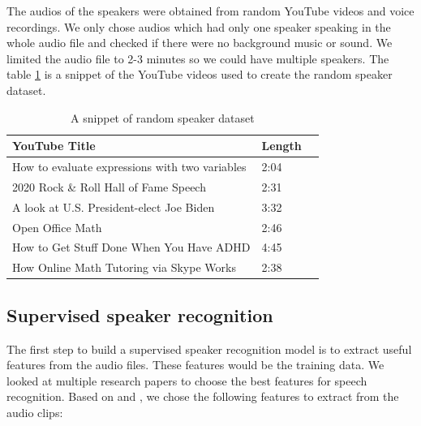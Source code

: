 \documentclass[10pt,twocolumn,letterpaper]{article}
\begin{document}
{The audios of the speakers were obtained from random YouTube videos and voice recordings. We only chose audios which had only one speaker speaking in the whole audio file and checked if there were no background music or sound. We limited the audio file to 2-3 minutes so we could have multiple speakers. The table \ref{tab:random-speaker-dataset} is a snippet of the YouTube videos used to create the random speaker dataset.



\begin{table}[h]
        \begin{tabular}{|l|l|l|}
        \hline
        \textbf{YouTube Title}                                       & \textbf{Length} \\ \hline
        How to evaluate expressions with two variables               & 2:04                         \\ \hline
        2020 Rock \& Roll Hall of Fame Speech                        & 2:31                         \\ \hline
        A look at U.S. President-elect Joe Biden                     & 3:32                         \\ \hline
        Open Office Math                                             & 2:46                         \\ \hline
        How to Get Stuff Done When You Have ADHD                     & 4:45                         \\ \hline
        How Online Math Tutoring via Skype Works                     & 2:38                         \\ \hline
        \end{tabular}
        \caption{A snippet of random speaker dataset}
        \label{tab:random-speaker-dataset}
\end{table}
 
}
\subsection{Supervised speaker recognition}


The first step to build a supervised speaker recognition model is to extract useful features from the audio files. These features would be the training data. We looked at multiple research papers to choose the best features for speech recognition. Based on \cite{Sharma} and \cite{Sonam}, we chose the following features to extract from the audio clips:
\end{document}
